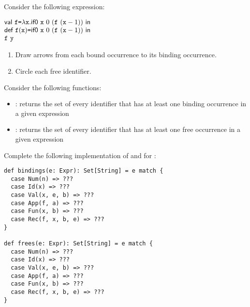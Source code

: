 \begin{exercise}

  Consider the following expression:

$
\begin{array}{@{}l@{}}
  \ebind{\cf}{\efun{\cx}{\eifz{\cx}{0}{(\eapp{\cf}{(\esub{\cx}{1})})}}}{ \\
  \erec{\cf}{\cx}{\eifz{\cx}{0}{(\eapp{\cf}{(\esub{\cx}{1})})}}{ \\
  \eapp{\cf}{\cy}
  }
  }
\end{array}
$

\begin{enumerate}
  \item Draw arrows from each bound occurrence to its binding occurrence.
  \item Circle each free identifier.
\end{enumerate}

\end{exercise}

\begin{exercise}

Consider the following functions:
\begin{itemize}
  \item {}: returns the set of every identifier that has at least
    one binding occurrence in a given expression
  \item {}: returns the set of every identifier that has at least
    one free occurrence in a given expression
\end{itemize}
Complete the following implementation of  and  for
\Lang:
\begin{verbatim}
def bindings(e: Expr): Set[String] = e match {
  case Num(n) => ???
  case Id(x) => ???
  case Val(x, e, b) => ???
  case App(f, a) => ???
  case Fun(x, b) => ???
  case Rec(f, x, b, e) => ???
}

def frees(e: Expr): Set[String] = e match {
  case Num(n) => ???
  case Id(x) => ???
  case Val(x, e, b) => ???
  case App(f, a) => ???
  case Fun(x, b) => ???
  case Rec(f, x, b, e) => ???
}
\end{verbatim}

\end{exercise}

